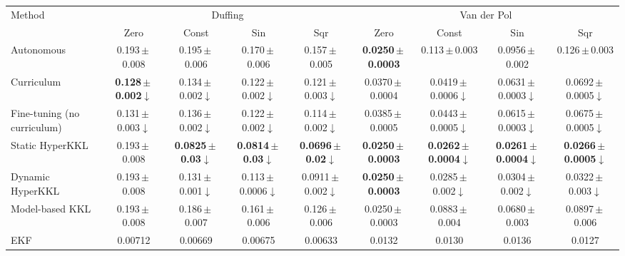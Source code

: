 \begin{tabular}{lcccccccc}
\toprule
Method & \multicolumn{4}{c}{Duffing} & \multicolumn{4}{c}{Van der Pol} \\
 & Zero & Const & Sin & Sqr & Zero & Const & Sin & Sqr \\
\midrule
Autonomous & 0.193\,$\pm$\,0.008 & 0.195\,$\pm$\,0.006 & 0.170\,$\pm$\,0.006 & 0.157\,$\pm$\,0.005 & \textbf{0.0250\,$\pm$\,0.0003} & 0.113\,$\pm$\,0.003 & 0.0956\,$\pm$\,0.002 & 0.126\,$\pm$\,0.003 \\
Curriculum & \textbf{0.128\,$\pm$\,0.002}$\downarrow$ & 0.134\,$\pm$\,0.002$\downarrow$ & 0.122\,$\pm$\,0.002$\downarrow$ & 0.121\,$\pm$\,0.003$\downarrow$ & 0.0370\,$\pm$\,0.0004 & 0.0419\,$\pm$\,0.0006$\downarrow$ & 0.0631\,$\pm$\,0.0003$\downarrow$ & 0.0692\,$\pm$\,0.0005$\downarrow$ \\
Fine-tuning (no curriculum) & 0.131\,$\pm$\,0.003$\downarrow$ & 0.136\,$\pm$\,0.002$\downarrow$ & 0.122\,$\pm$\,0.002$\downarrow$ & 0.114\,$\pm$\,0.002$\downarrow$ & 0.0385\,$\pm$\,0.0005 & 0.0443\,$\pm$\,0.0005$\downarrow$ & 0.0615\,$\pm$\,0.0003$\downarrow$ & 0.0675\,$\pm$\,0.0005$\downarrow$ \\
Static HyperKKL & 0.193\,$\pm$\,0.008 & \textbf{0.0825\,$\pm$\,0.03}$\downarrow$ & \textbf{0.0814\,$\pm$\,0.03}$\downarrow$ & \textbf{0.0696\,$\pm$\,0.02}$\downarrow$ & \textbf{0.0250\,$\pm$\,0.0003} & \textbf{0.0262\,$\pm$\,0.0004}$\downarrow$ & \textbf{0.0261\,$\pm$\,0.0004}$\downarrow$ & \textbf{0.0266\,$\pm$\,0.0005}$\downarrow$ \\
Dynamic HyperKKL & 0.193\,$\pm$\,0.008 & 0.131\,$\pm$\,0.001$\downarrow$ & 0.113\,$\pm$\,0.0006$\downarrow$ & 0.0911\,$\pm$\,0.002$\downarrow$ & \textbf{0.0250\,$\pm$\,0.0003} & 0.0285\,$\pm$\,0.002$\downarrow$ & 0.0304\,$\pm$\,0.002$\downarrow$ & 0.0322\,$\pm$\,0.003$\downarrow$ \\
\midrule
Model-based KKL & 0.193\,$\pm$\,0.008 & 0.186\,$\pm$\,0.007 & 0.161\,$\pm$\,0.006 & 0.126\,$\pm$\,0.006 & 0.0250\,$\pm$\,0.0003 & 0.0883\,$\pm$\,0.004 & 0.0680\,$\pm$\,0.003 & 0.0897\,$\pm$\,0.006 \\
EKF & 0.00712 & 0.00669 & 0.00675 & 0.00633 & 0.0132 & 0.0130 & 0.0136 & 0.0127 \\
\bottomrule
\end{tabular}

